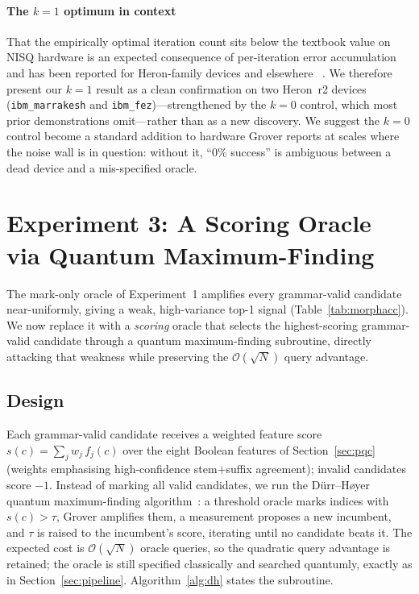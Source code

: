 \documentclass[journal]{IEEEtran}
\newcommand{\bigO}{\mathcal{O}}
\newcommand{\sqrtN}{\sqrt{N}}
\begin{document}
\paragraph{The $k{=}1$ optimum in context}
That the empirically optimal iteration count sits below the textbook value on
NISQ hardware is an expected consequence of per-iteration error accumulation and
has been reported for Heron-family devices and elsewhere%
~\cite{morales2018,mandviwalla2018}. We therefore present our $k{=}1$ result as a
clean confirmation on two Heron~r2 devices (\texttt{ibm\_marrakesh} and
\texttt{ibm\_fez})---strengthened by the $k{=}0$ control, which most prior
demonstrations omit---rather than as a new discovery. We suggest
the $k{=}0$ control become a standard addition to hardware Grover reports at
scales where the noise wall is in question: without it, ``0\% success'' is
ambiguous between a dead device and a mis-specified oracle.

\section{Experiment 3: A Scoring Oracle via Quantum Maximum-Finding}
\label{sec:scoring}
The mark-only oracle of Experiment~1 amplifies every grammar-valid candidate
near-uniformly, giving a weak, high-variance top-1 signal
(Table~\ref{tab:morphacc}). We now replace it with a \emph{scoring} oracle that
selects the highest-scoring grammar-valid candidate through a quantum
maximum-finding subroutine, directly attacking that weakness while preserving the
$\bigO(\sqrtN)$ query advantage.

\subsection{Design}
Each grammar-valid candidate receives a weighted feature score
$s(c)=\sum_j w_j\,f_j(c)$ over the eight Boolean features of
Section~\ref{sec:pqc} (weights emphasising high-confidence stem$+$suffix
agreement); invalid candidates score $-1$. Instead of marking all valid
candidates, we run the D\"urr--H\o yer quantum maximum-finding
algorithm~\cite{grover1996,bbht1998}: a threshold oracle marks indices with
$s(c)>\tau$, Grover amplifies them, a measurement proposes a new incumbent, and
$\tau$ is raised to the incumbent's score, iterating until no candidate beats it.
The expected cost is $\bigO(\sqrtN)$ oracle queries, so the quadratic query
advantage is retained; the oracle is still specified classically and searched
quantumly, exactly as in Section~\ref{sec:pipeline}. Algorithm~\ref{alg:dh}
states the subroutine.
\end{document}

